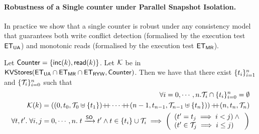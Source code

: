 \paragraph{Robustness of a Single counter under Parallel Snapshot Isolation.}
In practice we show that a single counter is robust under any consistency model 
that guarantees both write conflict detection (formalised by the execution test 
$\mathsf{ET}_{\mathsf{UA}}$) and monotonic reads (formalised by the execution test $\mathsf{ET}_{\mathsf{MR}}$). 
\begin{proposition}
\label{prop:counter_hhshape}
Let $\mathsf{Counter} = \{\mathsf{inc}(k), \mathsf{read}(k)\}$.
Let $\mathcal{K}$ be in $\mathsf{KVStores}(\mathsf{ET}_{\mathsf{UA}} \cap \mathsf{ET}_{\mathsf{MR}} \cap \mathsf{ET}_{\mathsf{RYW}}, \mathsf{Counter})$. Then we have that 
there exist $\{t_i\}_{i = 1}^{n}$ and $\{\mathcal{T}_{i}\}_{i = 0}^{n}$ such that 
\begin{align}
\forall i=0,\cdots,n.\mathcal{T}_{i} \cap \{t_{i}\}_{i=0}^{n} = \emptyset \label{eq:psi_counter_rwtxs}\\
\mathcal{K}(k) = \left( (0, t_{0}, \mathcal{T}_{0} \uplus \{t_1\}) \mathbb{+\!\!+} \cdots \mathbb{+\!\!+} (n-1, t_{n-1}, \mathcal{T}_{n-1} \uplus \{t_{n}\}) \right) 
\mathbb{+\!\!+} (n, t_{n}, \mathcal{T}_{n}) \label{eq:psi_counter_shape}\\
\forall t, t'.\;\forall i,j=0,\cdots, n.\; t \xrightarrow{\mathsf{SO}} t' 
\wedge t \in \{t_{i}\} \cup \mathcal{T}_{i} \implies 
\left(\begin{array}{l}
(t' = t_{j} \implies i < j) \wedge {} \\
(t' \in \mathcal{T}_{j} \implies i \leq j) \\
\end{array}\right) \label{eq:psi_counter_so}
\end{align}
%
%
%
\end{proposition}

